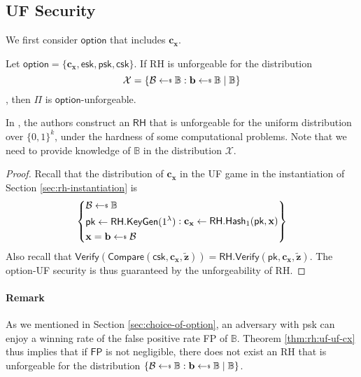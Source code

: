 
\subsection{UF Security}
\label{sec:security_analysis:rh:uf}

We first consider $\textsf{option}$ that includes $\mathbf{c_x}$.


\begin{theorem}
\label{thm:rh:uf-uf-cx}

Let $\textsf{option} = \{\mathbf{c_x}, \textsf{esk}, \textsf{psk}, \textsf{csk}\}$. If \textsf{RH} is unforgeable for the distribution
\[
	\mathcal{X} = \{ \mathcal{B} \getsdollar \mathbb{B}: \mathbf{b} \getsdollar \mathbb{B} \mid \mathbb{B} \}
\]
, then $\Pi$ is $\textsf{option}$-unforgeable. 

\end{theorem}

In \cite{cryptoeprint:2014/394}, the authors construct an $\textsf{RH}$ that is unforgeable for the uniform distribution over $\{0, 1\}^k$, under the hardness of some computational problems. Note that we need to provide knowledge of $\mathbb{B}$ in the distribution $\mathcal{X}$.

\begin{proof}

Recall that the distribution of $\mathbf{c_x}$ in the \textsf{UF} game in the instantiation of Section \ref{sec:rh-instantiation} is
\[
	\left \{
		\begin{aligned} 
			 & \mathcal{B} \getsdollar \mathbb{B} \\
			 & \textsf{pk} \gets \textsf{RH.KeyGen}(1^\lambda) \\
			 & \mathbf{x} = \mathbf{b} \getsdollar \mathcal{B} 
		\end{aligned} :
		\mathbf{c_x} \gets \textsf{RH.Hash}_1(\textsf{pk}, \mathbf{x})
	\right \}
\]
Also recall that $\textsf{Verify}(\textsf{Compare}(\textsf{csk}, \mathbf{c_x}, \mathbf{\tilde{z}} )) = \textsf{RH.Verify}(\textsf{pk}, \mathbf{c_x}, \mathbf{\tilde{z}} )$.
The \textsf{option}-UF security is thus guaranteed by the unforgeability of \textsf{RH}.

\end{proof}

\paragraph{Remark}
As we mentioned in Section \ref{sec:choice-of-option}, an adversary with \textsf{psk} can enjoy a winning rate of the false positive rate \textsf{FP} of $\mathbb{B}$. Theorem \ref{thm:rh:uf-uf-cx} thus implies that if $\textsf{FP}$ is not negligible, there does not exist an \textsf{RH} that is unforgeable for the distribution $\{ \mathcal{B} \getsdollar \mathbb{B}: \mathbf{b} \getsdollar \mathbb{B} \mid \mathbb{B} \}$.


